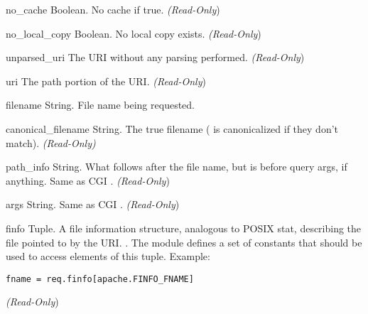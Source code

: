 \begin{memberdesc}[request]{no_cache}
  Boolean. No cache if true.
  \emph{(Read-Only})
\end{memberdesc}

\begin{memberdesc}[request]{no_local_copy}
  Boolean. No local copy exists.
  \emph{(Read-Only})
\end{memberdesc}

\begin{memberdesc}[request]{unparsed_uri}
  The URI without any parsing performed.
  \emph{(Read-Only})
\end{memberdesc}

\begin{memberdesc}[request]{uri}
  The path portion of the URI.
  \emph{(Read-Only})
\end{memberdesc}

\begin{memberdesc}[request]{filename}
  String. File name being requested.
\end{memberdesc}

\begin{memberdesc}[request]{canonical_filename}
  String. The true filename ( is canonicalized if
  they don't match).  \emph{(Read-Only)}
\end{memberdesc}

\begin{memberdesc}[request]{path_info}
  String. What follows after the file name, but is before query args, if
  anything. Same as CGI .
  \emph{(Read-Only})
\end{memberdesc}

\begin{memberdesc}[request]{args}
  String. Same as CGI .
  \emph{(Read-Only})
\end{memberdesc}

\begin{memberdesc}[request]{finfo}
  Tuple. A file information structure, analogous to POSIX stat,
  describing the file pointed to by the URI.  . The  module defines a set of 
  constants that should be used to access elements of this
  tuple. Example:
  \begin{verbatim}
fname = req.finfo[apache.FINFO_FNAME]
  \end{verbatim}
  \emph{(Read-Only})
\end{memberdesc}

